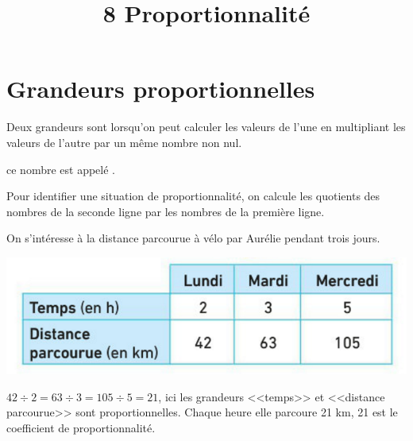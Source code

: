 \documentclass[12pt,a4paper]{article}
\date{}
\title{\textcircled{{\normalsize{8}}} Proportionnalité}
\begin{document}
\maketitle








\section{Grandeurs proportionnelles}

\begin{mydef}
	Deux grandeurs sont  lorsqu'on peut calculer les valeurs de l'une en multipliant les valeurs de l'autre par un même nombre non nul.
	
	ce nombre est appelé .
\end{mydef}


\begin{mymeth}
	Pour identifier une situation de proportionnalité, on calcule les quotients des nombres de la seconde ligne par les nombres de la première ligne.
\end{mymeth}

\begin{myex}
	
		On s'intéresse à la distance parcourue à vélo par Aurélie pendant trois jours.
		
		\begin{center}
			\includegraphics[scale=0.5]{tab1}
		\end{center}
	

	$42 \div 2 = 63 \div 3 = 105 \div 5 = 21$, ici les grandeurs <<temps>> et <<distance parcourue>> sont proportionnelles. Chaque heure elle parcoure 21 km, 21 est le coefficient de proportionnalité.

\end{myex}	
\end{document}
